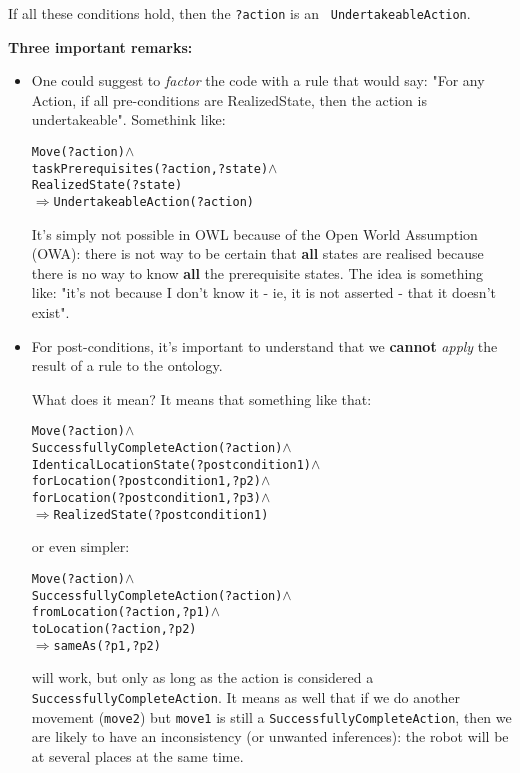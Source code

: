 If all these conditions hold, then the {\tt ?action} is an {\tt
UndertakeableAction}.

{\bf Three important remarks:}


\begin{itemize}
\item  One could suggest to \emph{factor} the code with a rule that would say:
"For any Action, if all pre-conditions are RealizedState, then the action is
undertakeable". Somethink like:


\begin{alltt}

Move(?action) \(\land\)
taskPrerequisites(?action, ?state) \(\land\)
RealizedState(?state)
\(\Rightarrow\) UndertakeableAction(?action)

\end{alltt}

It's simply not possible in OWL because of the Open World Assumption (OWA):
there is not way to be certain that {\bf all} states are realised because there
is no way to know {\bf all} the prerequisite states. The idea is something
like: "it's not because I don't know it - ie, it is not asserted - that it
doesn't exist".


\item  For post-conditions, it's important to understand that we {\bf cannot}
\emph{apply} the result of a rule to the ontology.

What does it mean? It means that something like that:



\begin{alltt}

Move(?action) \(\land\)
SuccessfullyCompleteAction(?action) \(\land\)
IdenticalLocationState(?postcondition1) \(\land\)
forLocation(?postcondition1, ?p2) \(\land\)
forLocation(?postcondition1, ?p3) \(\land\)
\(\Rightarrow\) RealizedState(?postcondition1)

\end{alltt}

or even simpler:



\begin{alltt}

Move(?action) \(\land\)
SuccessfullyCompleteAction(?action) \(\land\)
fromLocation(?action, ?p1) \(\land\)
toLocation(?action, ?p2)
\(\Rightarrow\) sameAs(?p1, ?p2)

\end{alltt}

will work, but only as long as the action is considered a {\tt
SuccessfullyCompleteAction}. It means as well that if we do another movement
({\tt move2}) but {\tt move1} is still a {\tt SuccessfullyCompleteAction}, then
we are likely to have an inconsistency (or unwanted inferences): the robot will
be at several places at the same time.


\end{itemize}
